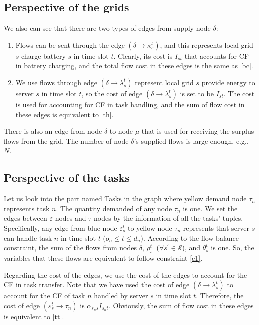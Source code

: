 \documentclass[conference, 10pt, ﬁnal, letterpaper, twocolumn]{IEEEtran}
\begin{document}
\subsection{Perspective of the grids}

We also can see that there are two types of edges from supply node $\delta$:
\begin{enumerate}
    \item Flows can be sent through the edge $(\delta \rightarrow\kappa^{t}_{s})$, and this represents local grid $s$ charge battery $s$ in time slot $t$. Clearly, its cost is $I_{st}$ that accounts for CF in battery charging, and the total flow cost in these edges is the same as \eqref{bc}.
    \item We use flows through edge $(\delta \rightarrow \lambda^{t}_{s})$ represent local grid $s$ provide energy to server $s$ in time slot $t$, so the cost of edge $(\delta \rightarrow \lambda^{t}_{s})$ is set to be $I_{st}$. The cost is used for accounting for CF in task handling, and the sum of flow cost in these edges is equivalent to \eqref{th}.
\end{enumerate}
There is also an edge from node $\delta$ to node $\mu$ that is used for receiving the surplus flows from the grid. The number of node $\delta$'s supplied flows is large enough, e.g., $N$. 

\subsection{Perspective of the tasks}

Let us look into the part named Tasks in the graph where yellow demand node $\tau_n$ represents task $n$. The quantity demanded of any node $\tau_n$ is one. We set the edges between $\varepsilon$-nodes and $\tau$-nodes by the information of all the tasks' tuples. Specifically, any edge from blue node $\varepsilon^{t}_{s}$ to yellow node $\tau_{n}$ represents that server $s$ can handle task $n$ in time slot $t$ ($o_n \leq t \leq d_n$). According to the flow balance constraint, the sum of the flows from nodes $\delta$, $\rho^{t}_{s^\prime}$ ($\forall s^\prime \in \mathcal{S}$), and $\theta^{t}_{s}$ is one. So, the variables that these flows are equivalent to follow constraint \eqref{c1}.

Regarding the cost of the edges, we use the cost of the edges to account for the CF in task transfer. Note that we have used the cost of edge $(\delta\rightarrow\lambda^{t}_{s})$ to account for the CF of task $n$ handled by server $s$ in time slot $t$. Therefore, the cost of edge $(\varepsilon^{t}_{s}\rightarrow\tau_n)$ is $\alpha_{s_{n}s}I_{s_{n}t}$. Obviously, the sum of flow cost in these edges is equivalent to \eqref{tt}.
\end{document}
